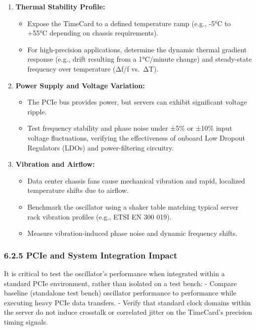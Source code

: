 \begin{enumerate}
\def\labelenumi{\arabic{enumi}.}
\tightlist
\item
  \textbf{Thermal Stability Profile:}

  \begin{itemize}
  \tightlist
  \item
    Expose the TimeCard to a defined temperature ramp (e.g., -5°C to
    +55°C depending on chassis requirements).
  \item
    For high-precision applications, determine the dynamic thermal
    gradient response (e.g., drift resulting from a 1°C/minute change)
    and steady-state frequency over temperature (Δf/f vs.~ΔT).
  \end{itemize}
\item
  \textbf{Power Supply and Voltage Variation:}

  \begin{itemize}
  \tightlist
  \item
    The PCIe bus provides power, but servers can exhibit significant
    voltage ripple.
  \item
    Test frequency stability and phase noise under ±5\% or ±10\% input
    voltage fluctuations, verifying the effectiveness of onboard Low
    Dropout Regulators (LDOs) and power-filtering circuitry.
  \end{itemize}
\item
  \textbf{Vibration and Airflow:}

  \begin{itemize}
  \tightlist
  \item
    Data center chassis fans cause mechanical vibration and rapid,
    localized temperature shifts due to airflow.
  \item
    Benchmark the oscillator using a shaker table matching typical
    server rack vibration profiles (e.g., ETSI EN 300 019).
  \item
    Measure vibration-induced phase noise and dynamic frequency shifts.
  \end{itemize}
\end{enumerate}

\subsubsection{6.2.5 PCIe and System Integration
Impact}\label{pcie-and-system-integration-impact}

It is critical to test the oscillator's performance when integrated
within a standard PCIe environment, rather than isolated on a test
bench: - Compare baseline (standalone test bench) oscillator performance
to performance while executing heavy PCIe data transfers. - Verify that
standard clock domains within the server do not induce crosstalk or
correlated jitter on the TimeCard's precision timing signals.

